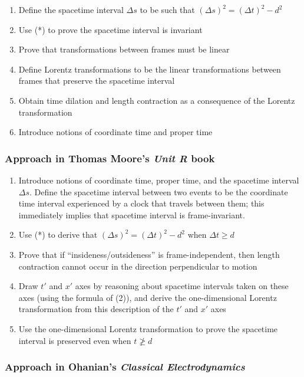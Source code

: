\documentclass{article}
\begin{document}
\begin{enumerate}
    \item Define the spacetime interval $\Delta s$ to be such that $(\Delta s)^2 = (\Delta t)^2 - d^2$
    \item Use (*) to prove the spacetime interval is invariant
    \item Prove that transformations between frames must be linear 
    \item Define Lorentz transformations to be the linear transformations between frames that preserve the spacetime interval
    \item Obtain time dilation and length contraction as a consequence of the Lorentz transformation
    \item Introduce notions of coordinate time and proper time
\end{enumerate}

\subsubsection*{Approach in Thomas Moore's \textit{Unit R} book}

\begin{enumerate}
    \item Introduce notions of coordinate time, proper time, and the spacetime interval $\Delta s$. Define the spacetime interval between two events to be the coordinate time interval experienced by a clock that travels between them; this immediately implies that spacetime interval is frame-invariant.
    \item Use (*) to derive that $(\Delta s)^2 = (\Delta t)^2 - d^2$ when $\Delta t \geq d$
    \item Prove that if ``insideness/outsideness'' is frame-independent, then length contraction cannot occur in the direction perpendicular to motion
    \item Draw $t'$ and $x'$ axes by reasoning about spacetime intervals taken on these axes (using the formula of (2)), and derive the one-dimensional Lorentz transformation from this description of the $t'$ and $x'$ axes
    \item Use the one-dimensional Lorentz transformation to prove the spacetime interval is preserved even when $t \ngeq d$
\end{enumerate} 

\subsubsection*{Approach in Ohanian's \textit{Classical Electrodynamics}}
\end{document}
